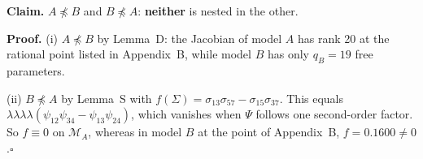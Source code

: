 \documentclass[10pt,a4paper]{article}
\newcommand{\nnest}{\not\preceq}
\begin{document}
\par\bigskip
\noindent\textbf{Claim.} $A \nnest B$ and $B \nnest A$: \textbf{neither} is nested in the other.\par\smallskip
\noindent\textbf{Proof.} (i) $A\nnest B$ by Lemma~D: the Jacobian of model $A$ has rank 20 at the rational point listed in Appendix~B, while model $B$ has only $q_B=19$ free parameters.\par\smallskip
\noindent(ii) $B\nnest A$ by Lemma~S with $f(\Sigma)=\sigma_{13}\sigma_{57} - \sigma_{15}\sigma_{37}$. This equals $\lambda\lambda\lambda\lambda(\psi_{12}\psi_{34}-\psi_{13}\psi_{24})$, which vanishes when $\Psi$ follows one second-order factor. So $f\equiv0$ on $\mathcal M_A$, whereas in model $B$ at the point of Appendix~B, $f=0.1600\neq0$.\hfill$\square$\par\medskip
{}

\clearpage
\end{document}
